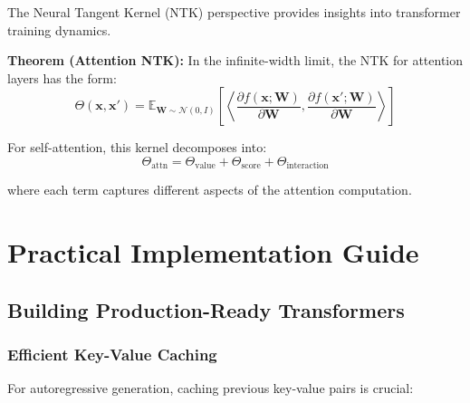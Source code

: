 \documentclass[11pt]{article}
\begin{document}
The Neural Tangent Kernel (NTK) perspective provides insights into transformer training dynamics.

\textbf{Theorem (Attention NTK):} In the infinite-width limit, the NTK for attention layers has the form:
\begin{equation}
\Theta(\mathbf{x}, \mathbf{x}') = \mathbb{E}_{\mathbf{W} \sim \mathcal{N}(0, I)}\left[\left\langle \frac{\partial f(\mathbf{x}; \mathbf{W})}{\partial \mathbf{W}}, \frac{\partial f(\mathbf{x}'; \mathbf{W})}{\partial \mathbf{W}} \right\rangle\right]
\end{equation}

For self-attention, this kernel decomposes into:
\begin{equation}
\Theta_{\text{attn}} = \Theta_{\text{value}} + \Theta_{\text{score}} + \Theta_{\text{interaction}}
\end{equation}

where each term captures different aspects of the attention computation.

\section{Practical Implementation Guide}

\subsection{Building Production-Ready Transformers}

\subsubsection{Efficient Key-Value Caching}

For autoregressive generation, caching previous key-value pairs is crucial:
\end{document}
